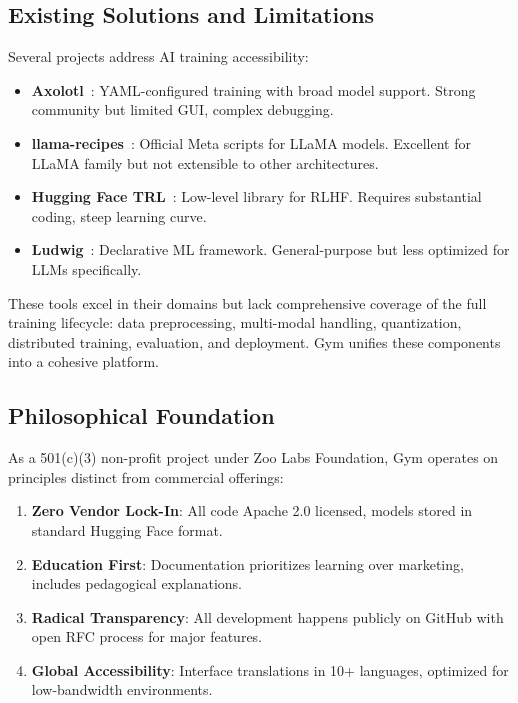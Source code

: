 \documentclass[11pt,letterpaper]{article}
\begin{document}
\subsection{Existing Solutions and Limitations}

Several projects address AI training accessibility:

\begin{itemize}
\item \textbf{Axolotl}~\citep{axolotl2024}: YAML-configured training with broad model support. Strong community but limited GUI, complex debugging.
\item \textbf{llama-recipes}~\citep{meta2024llamarecipes}: Official Meta scripts for LLaMA models. Excellent for LLaMA family but not extensible to other architectures.
\item \textbf{Hugging Face TRL}~\citep{vonwerra2022trl}: Low-level library for RLHF. Requires substantial coding, steep learning curve.
\item \textbf{Ludwig}~\citep{molino2019ludwig}: Declarative ML framework. General-purpose but less optimized for LLMs specifically.
\end{itemize}

These tools excel in their domains but lack comprehensive coverage of the full training lifecycle: data preprocessing, multi-modal handling, quantization, distributed training, evaluation, and deployment. Gym unifies these components into a cohesive platform.

\subsection{Philosophical Foundation}

As a 501(c)(3) non-profit project under Zoo Labs Foundation, Gym operates on principles distinct from commercial offerings:

\begin{enumerate}
\item \textbf{Zero Vendor Lock-In}: All code Apache 2.0 licensed, models stored in standard Hugging Face format.
\item \textbf{Education First}: Documentation prioritizes learning over marketing, includes pedagogical explanations.
\item \textbf{Radical Transparency}: All development happens publicly on GitHub with open RFC process for major features.
\item \textbf{Global Accessibility}: Interface translations in 10+ languages, optimized for low-bandwidth environments.
\end{enumerate}
\end{document}
